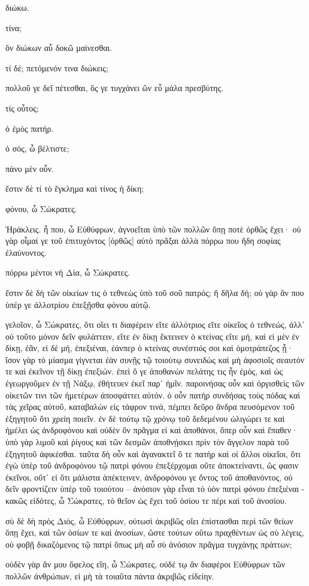 διώκω.

τίνα; 

\versification{[4a]}
ὃν
διώκων
αὖ
δοκῶ
μαίνεσθαι.

τί
δέ;
πετόμενόν
τινα
διώκεις;

πολλοῦ
γε
δεῖ
πέτεσθαι,
ὅς
γε
τυγχάνει
ὢν
εὖ
μάλα
πρεσβύτης.

τίς
οὗτος;

ὁ
ἐμὸς
πατήρ.

ὁ
σός,
ὦ
βέλτιστε;

πάνυ
μὲν
οὖν.

ἔστιν
δὲ
τί
τὸ
ἔγκλημα
καὶ
τίνος
ἡ
δίκη;

φόνου,
ὦ
Σώκρατες.

Ἡράκλεις.
ἦ
που,
ὦ
Εὐθύφρων,
ἀγνοεῖται
ὑπὸ
τῶν
πολλῶν
ὅπῃ
ποτὲ
ὀρθῶς
ἔχει·
οὐ
γὰρ
οἶμαί
γε
τοῦ
ἐπιτυχόντος
\versification{[4b]}
[ὀρθῶς]
αὐτὸ
πρᾶξαι
ἀλλὰ
πόρρω
που
ἤδη
σοφίας
ἐλαύνοντος.

πόρρω
μέντοι
νὴ
Δία,
ὦ
Σώκρατες.

ἔστιν
δὲ
δὴ
τῶν
οἰκείων
τις
ὁ
τεθνεὼς
ὑπὸ
τοῦ
σοῦ
πατρός;
ἢ
δῆλα
δή;
οὐ
γὰρ
ἄν
που
ὑπέρ
γε
ἀλλοτρίου
ἐπεξῇσθα
φόνου
αὐτῷ.

γελοῖον,
ὦ
Σώκρατες,
ὅτι
οἴει
τι
διαφέρειν
εἴτε
ἀλλότριος
εἴτε
οἰκεῖος
ὁ
τεθνεώς,
ἀλλ᾽
οὐ
τοῦτο
μόνον
δεῖν
φυλάττειν,
εἴτε
ἐν
δίκῃ
ἔκτεινεν
ὁ
κτείνας
εἴτε
μή,
καὶ
εἰ
μὲν
ἐν
δίκῃ,
ἐᾶν,
εἰ
δὲ
μή,
ἐπεξιέναι,
ἐάνπερ
ὁ
κτείνας
συνέστιός
\versification{[4c]}
σοι
καὶ
ὁμοτράπεζος
ᾖ·
ἴσον
γὰρ
τὸ
μίασμα
γίγνεται
ἐὰν
συνῇς
τῷ
τοιούτῳ
συνειδὼς
καὶ
μὴ
ἀφοσιοῖς
σεαυτόν
τε
καὶ
ἐκεῖνον
τῇ
δίκῃ
ἐπεξιών.
ἐπεὶ
ὅ
γε
ἀποθανὼν
πελάτης
τις
ἦν
ἐμός,
καὶ
ὡς
ἐγεωργοῦμεν
ἐν
τῇ
Νάξῳ,
ἐθήτευεν
ἐκεῖ
παρ᾽
ἡμῖν.
παροινήσας
οὖν
καὶ
ὀργισθεὶς
τῶν
οἰκετῶν
τινι
τῶν
ἡμετέρων
ἀποσφάττει
αὐτόν.
ὁ
οὖν
πατὴρ
συνδήσας
τοὺς
πόδας
καὶ
τὰς
χεῖρας
αὐτοῦ,
καταβαλὼν
εἰς
τάφρον
τινά,
πέμπει
δεῦρο
ἄνδρα
πευσόμενον
τοῦ
ἐξηγητοῦ
ὅτι
χρείη
\versification{[4d]}
ποιεῖν.
ἐν
δὲ
τούτῳ
τῷ
χρόνῳ
τοῦ
δεδεμένου
ὠλιγώρει
τε
καὶ
ἠμέλει
ὡς
ἀνδροφόνου
καὶ
οὐδὲν
ὂν
πρᾶγμα
εἰ
καὶ
ἀποθάνοι,
ὅπερ
οὖν
καὶ
ἔπαθεν·
ὑπὸ
γὰρ
λιμοῦ
καὶ
ῥίγους
καὶ
τῶν
δεσμῶν
ἀποθνῄσκει
πρὶν
τὸν
ἄγγελον
παρὰ
τοῦ
ἐξηγητοῦ
ἀφικέσθαι.
ταῦτα
δὴ
οὖν
καὶ
ἀγανακτεῖ
ὅ
τε
πατὴρ
καὶ
οἱ
ἄλλοι
οἰκεῖοι,
ὅτι
ἐγὼ
ὑπὲρ
τοῦ
ἀνδροφόνου
τῷ
πατρὶ
φόνου
ἐπεξέρχομαι
οὔτε
ἀποκτείναντι,
ὥς
φασιν
ἐκεῖνοι,
οὔτ᾽
εἰ
ὅτι
μάλιστα
ἀπέκτεινεν,
ἀνδροφόνου
γε
ὄντος
τοῦ
ἀποθανόντος,
οὐ
δεῖν
φροντίζειν
ὑπὲρ
τοῦ
τοιούτου
--
ἀνόσιον
\versification{[4e]}
γὰρ
εἶναι
τὸ
ὑὸν
πατρὶ
φόνου
ἐπεξιέναι
-
κακῶς
εἰδότες,
ὦ
Σώκρατες,
τὸ
θεῖον
ὡς
ἔχει
τοῦ
ὁσίου
τε
πέρι
καὶ
τοῦ
ἀνοσίου.

σὺ
δὲ
δὴ
πρὸς
Διός,
ὦ
Εὐθύφρων,
οὑτωσὶ
ἀκριβῶς
οἴει
ἐπίστασθαι
περὶ
τῶν
θείων
ὅπῃ
ἔχει,
καὶ
τῶν
ὁσίων
τε
καὶ
ἀνοσίων,
ὥστε
τούτων
οὕτω
πραχθέντων
ὡς
σὺ
λέγεις,
οὐ
φοβῇ
δικαζόμενος
τῷ
πατρὶ
ὅπως
μὴ
αὖ
σὺ
ἀνόσιον
πρᾶγμα
τυγχάνῃς
πράττων;

οὐδὲν
γὰρ
ἄν
μου
ὄφελος
εἴη,
ὦ
Σώκρατες,
οὐδέ
\versification{[5a]}
τῳ
ἂν
διαφέροι
Εὐθύφρων
τῶν
πολλῶν
ἀνθρώπων,
εἰ
μὴ
τὰ
τοιαῦτα
πάντα
ἀκριβῶς
εἰδείην.

